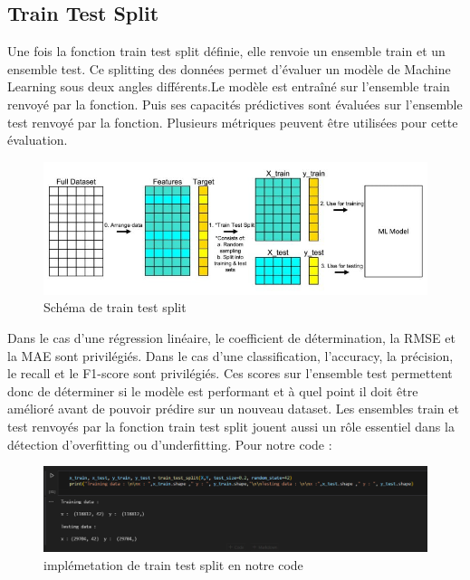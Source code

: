 \documentclass[a4paper,12pt]{report}
\begin{document}
\subsection{Train Test Split}
\noindent \normalsize Une fois la fonction train test split\cite{ sklearn-train-test-split} définie, elle renvoie un ensemble train et un ensemble test. Ce splitting des données permet d’évaluer un modèle de Machine Learning sous deux angles différents.Le modèle est entraîné sur l’ensemble train renvoyé par la fonction. Puis ses capacités prédictives sont évaluées sur l’ensemble test renvoyé par la fonction. Plusieurs métriques peuvent être utilisées pour cette évaluation.
\begin{figure}[H]
\centering
 \includegraphics[scale=0.6]{outils-images/data8.jpg}
\caption{Schéma de train test split}
\end{figure} 
\noindent \normalsize Dans le cas d’une régression linéaire, le coefficient de détermination, la RMSE et la MAE sont privilégiés. Dans le cas d’une classification, l’accuracy, la précision, le recall et le F1-score sont privilégiés. Ces scores sur l’ensemble test permettent donc de déterminer si le modèle est performant et à quel point il doit être amélioré avant de pouvoir prédire sur un nouveau dataset.
Les ensembles train et test renvoyés par la fonction train test split jouent aussi un rôle essentiel dans la détection d’overfitting ou d’underfitting.
Pour notre code :
\begin{figure}[H]
\centering
 \includegraphics[scale=0.7]{outils-images/data9.png}
\caption{implémetation de train test split en notre code}
\end{figure} 
\end{document}
